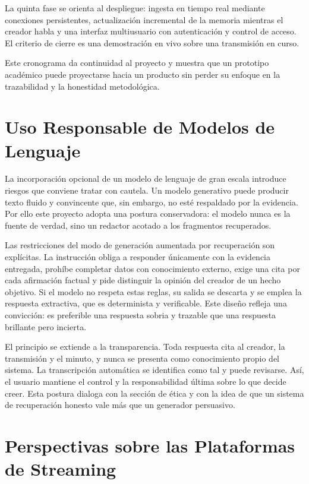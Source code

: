 \documentclass[12pt,a4paper]{article}
\begin{document}
La quinta fase se orienta al despliegue: ingesta en tiempo real mediante conexiones persistentes, actualización incremental de la memoria mientras el creador habla y una interfaz multiusuario con autenticación y control de acceso. El criterio de cierre es una demostración en vivo sobre una transmisión en curso.

Este cronograma da continuidad al proyecto y muestra que un prototipo académico puede proyectarse hacia un producto sin perder su enfoque en la trazabilidad y la honestidad metodológica.



\section{Uso Responsable de Modelos de Lenguaje}
\label{sec:responsable}

La incorporación opcional de un modelo de lenguaje de gran escala introduce riesgos que conviene tratar con cautela. Un modelo generativo puede producir texto fluido y convincente que, sin embargo, no esté respaldado por la evidencia. Por ello este proyecto adopta una postura conservadora: el modelo nunca es la fuente de verdad, sino un redactor acotado a los fragmentos recuperados.

Las restricciones del modo de generación aumentada por recuperación son explícitas. La instrucción obliga a responder únicamente con la evidencia entregada, prohíbe completar datos con conocimiento externo, exige una cita por cada afirmación factual y pide distinguir la opinión del creador de un hecho objetivo. Si el modelo no respeta estas reglas, su salida se descarta y se emplea la respuesta extractiva, que es determinista y verificable. Este diseño refleja una convicción: es preferible una respuesta sobria y trazable que una respuesta brillante pero incierta.

El principio se extiende a la transparencia. Toda respuesta cita al creador, la transmisión y el minuto, y nunca se presenta como conocimiento propio del sistema. La transcripción automática se identifica como tal y puede revisarse. Así, el usuario mantiene el control y la responsabilidad última sobre lo que decide creer. Esta postura dialoga con la sección de ética y con la idea de que un sistema de recuperación honesto vale más que un generador persuasivo.



\section{Perspectivas sobre las Plataformas de Streaming}
\label{sec:plataformas}
\end{document}
